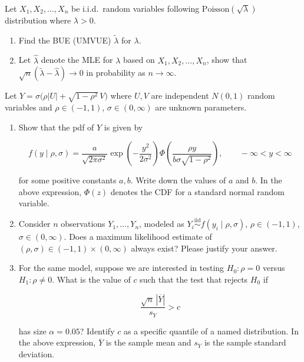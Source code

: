 \documentclass[11pt,a4paper]{article}
\newcommand{\examstatement}[1]{%
  \par\addvspace{0.85em}%
  \noindent{\bfseries #1}\par\nobreak\addvspace{0.28em}%
}
\begin{document}
\examstatement{Problem 10. [10 pts.]}
Let \( X_1, X_2, \dots, X_n \) be i.i.d.\ random variables following \( \mathrm{Poisson}(\sqrt{\lambda}) \) distribution where \( \lambda > 0 \).
\begin{enumerate}[label=(\alph*)]
    \item Find the BUE (UMVUE) \( \tilde{\lambda} \) for \( \lambda \).
    \item Let \( \hat{\lambda} \) denote the MLE for \( \lambda \) based on \( X_1, X_2, \dots, X_n \), show that \( \sqrt{n}(\tilde{\lambda} - \hat{\lambda}) \to 0 \) in probability as \( n \to \infty \).
\end{enumerate}

\examstatement{Problem 11. [15 pts.]}
Let \( Y = \sigma\bigl(\rho |U| + \sqrt{1 - \rho^2}\, V\bigr) \) where \( U, V \) are independent \( N(0, 1) \) random variables and \( \rho \in (-1, 1) \), \( \sigma \in (0, \infty) \) are unknown parameters.
\begin{enumerate}[label=(\alph*)]
    \item Show that the pdf of \( Y \) is given by

    \[
    f(y \mid \rho, \sigma)
    =
    \frac{a}{\sqrt{2\pi\sigma^2}}
    \exp\left(-\frac{y^2}{2\sigma^2}\right)
    \Phi\left( \frac{\rho y}{b\sigma\sqrt{1-\rho^2}} \right),
    \qquad -\infty < y < \infty
    \]

    for some positive constants \( a, b \). Write down the values of \( a \) and \( b \). In the above expression, \( \Phi(z) \) denotes the CDF for a standard normal random variable.
    \item Consider \( n \) observations \( Y_1, \dots, Y_n \), modeled as \( Y_i \stackrel{\mathrm{iid}}{\sim} f(y_i \mid \rho, \sigma) \), \( \rho \in (-1, 1) \), \( \sigma \in (0, \infty) \). Does a maximum likelihood estimate of \( (\rho, \sigma) \in (-1, 1) \times (0, \infty) \) always exist? Please justify your answer.
    \item For the same model, suppose we are interested in testing \( H_0 : \rho = 0 \) versus \( H_1 : \rho \neq 0 \). What is the value of \( c \) such that the test that rejects \( H_0 \) if

    \[
    \frac{\sqrt{n}\, |\overline{Y}|}{s_Y} > c
    \]

    has size \( \alpha = 0.05 \)? Identify \( c \) as a specific quantile of a named distribution. In the above expression, \( \overline{Y} \) is the sample mean and \( s_Y \) is the sample standard deviation.
\end{enumerate}
\end{document}
